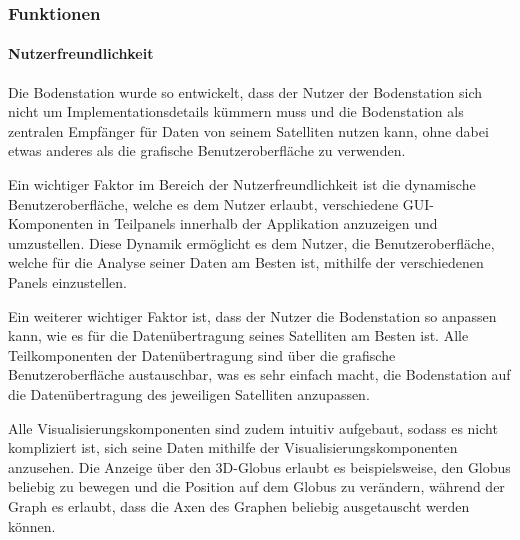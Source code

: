 \subsubsection{Funktionen}
\paragraph{Nutzerfreundlichkeit}
Die Bodenstation wurde so entwickelt, dass der Nutzer der Bodenstation sich nicht um Implementationsdetails kümmern muss und die Bodenstation als zentralen Empfänger für Daten von seinem Satelliten nutzen kann, ohne dabei etwas anderes als die grafische Benutzeroberfläche zu verwenden. 

Ein wichtiger Faktor im Bereich der Nutzerfreundlichkeit ist die dynamische Benutzeroberfläche, welche es dem Nutzer erlaubt, verschiedene GUI-Komponenten in Teilpanels innerhalb der Applikation anzuzeigen und umzustellen. Diese Dynamik ermöglicht es dem Nutzer, die Benutzeroberfläche, welche für die Analyse seiner Daten am Besten ist, mithilfe der verschiedenen Panels einzustellen.

Ein weiterer wichtiger Faktor ist, dass der Nutzer die Bodenstation so anpassen kann, wie es für die Datenübertragung seines Satelliten am Besten ist. Alle Teilkomponenten der Datenübertragung sind über die grafische Benutzeroberfläche austauschbar, was es sehr einfach macht, die Bodenstation auf die Datenübertragung des jeweiligen Satelliten anzupassen.

Alle Visualisierungskomponenten sind zudem intuitiv aufgebaut, sodass es nicht kompliziert ist, sich seine Daten mithilfe der Visualisierungskomponenten anzusehen. Die Anzeige über den 3D-Globus erlaubt es beispielsweise, den Globus beliebig zu bewegen und die Position auf dem Globus zu verändern, während der Graph es erlaubt, dass die Axen des Graphen beliebig ausgetauscht werden können.

